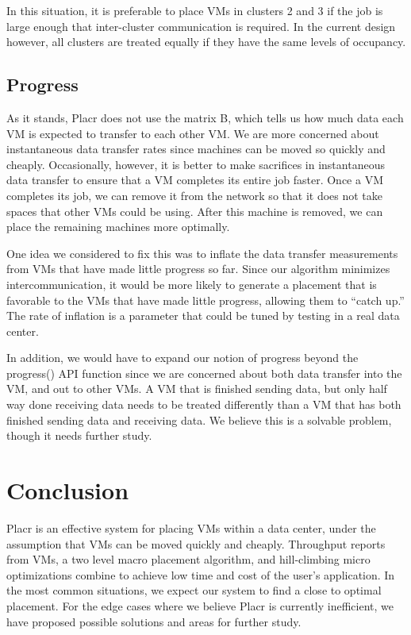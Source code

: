 \documentclass[11pt]{article}
\begin{document}
 In this situation, it is preferable to place VMs in clusters 2 and 3 if the job is large enough that inter-cluster communication is required.  In the current design however, all clusters are treated equally if they have the same levels of occupancy.
 
\subsection{Progress}

As it stands, Placr does not use the matrix B, which tells us how much data each VM is expected to transfer to each other VM. We are more concerned about instantaneous data transfer rates since machines can be moved so quickly and cheaply.  Occasionally, however, it is better to make sacrifices in instantaneous data transfer to ensure that a VM completes its entire job faster.  Once a VM completes its job, we can remove it from the network so that it does not take spaces that other VMs could be using.  After this machine is removed, we can place the remaining machines more optimally.

One idea we considered to fix this was to inflate the data transfer measurements from VMs that have made little progress so far.  Since our algorithm minimizes intercommunication, it would be more likely to generate a placement that is favorable to the VMs that have made little progress, allowing them to “catch up.”  The rate of inflation is a parameter that could be tuned by testing in a real data center.

In addition, we would have to expand our notion of progress beyond the progress() API function since we are concerned about both data transfer into the VM, and out to other VMs.  A VM that is finished sending data, but only half way done receiving data needs to be treated differently than a VM that has both finished sending data and receiving data.  We believe this is a solvable problem, though it needs further study.

\section{Conclusion}

Placr is an effective system for placing VMs within a data center, under the assumption that VMs can be moved quickly and cheaply.  Throughput reports from VMs, a two level macro placement algorithm, and hill-climbing micro optimizations combine to achieve low time and cost of the user’s application.  In the most common situations, we expect our system to find a close to optimal placement. For the edge cases where we believe Placr is currently inefficient, we have proposed possible solutions and areas for further study.
\end{document}
